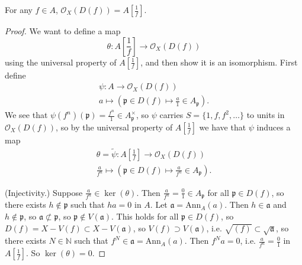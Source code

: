 \documentclass[12pt]{article}
\begin{document}
\begin{proposition}
	For any $f\in A$, $\mathcal{O}_X(D(f))=A[\frac{1}{f}]$.
\end{proposition}
\begin{proof}
	We want to define a map 
	\begin{equation*}
		\theta: A[\frac{1}{f}]\to \mathcal{O}_X(D(f))
	\end{equation*}
	using the universal property of $A[\frac{1}{f}]$, and then show it is an isomorphism. First define 
	\begin{gather*}
		\psi: A \to \mathcal{O}_X(D(f)) \\
		a \mapsto (\mathfrak{p}\in D(f) \mapsto \frac{a}{1}\in A_\mathfrak{p}).
	\end{gather*}
	We see that $\psi(f^n)(\mathfrak{p})=\frac{f^n}{1}\in A_\mathfrak{p}^\times$, so $\psi$ carries $S=\{1, f, f^2,\dots \}$ to units in $\mathcal{O}_X(D(f))$, so by the universal property of $A[\frac{1}{f}]$ we have that $\psi$ induces a map 
	\begin{gather*}
		\theta = \tilde{\psi}: A[\frac{1}{f}]\to \mathcal{O}_X(D(f)) \\
		\frac{a}{f^n} \mapsto (\mathfrak{p}\in D(f) \mapsto \frac{a}{f^n}\in A_\mathfrak{p}).
	\end{gather*}

	(Injectivity.) Suppose $\frac{a}{f^n}\in\ker(\theta)$. Then $\frac{a}{f^n}=\frac{0}{1}\in A_\mathfrak{p}$ for all $\mathfrak{p}\in D(f)$, so there exists $h\not\in\mathfrak{p}$ such that $ha=0$ in $A$. Let $\mathfrak{a}=\text{Ann}_A(a)$. Then $h\in\mathfrak{a}$ and $h\not\in\mathfrak{p}$, so $\mathfrak{a}\not\subset\mathfrak{p}$, so $\mathfrak{p}\not\in V(\mathfrak{a})$. This holds for all $\mathfrak{p}\in D(f)$, so $D(f)=X-V(f)\subset X-V(\mathfrak{a})$, so $V(f)\supset V(\mathfrak{a})$, i.e. $\sqrt{(f)}\subset\sqrt{\mathfrak{a}}$, so there exists $N\in\mathbb{N}$ such that $f^N\in\mathfrak{a}=\text{Ann}_A(a)$. Then $f^Na=0$, i.e. $\frac{a}{f^n}=\frac{0}{1}$ in $A[\frac{1}{f}]$. So $\ker(\theta)=0$.


\end{proof}
\end{document}
